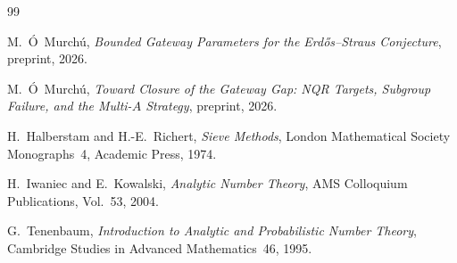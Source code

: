 \documentclass[12pt]{amsart}
\theoremstyle{definition}
\theoremstyle{remark}
\begin{document}
\begin{thebibliography}{99}

M.~\'O~Murch\'u,
\textit{Bounded Gateway Parameters for the
Erd\H{o}s--Straus Conjecture},
preprint, 2026.

M.~\'O~Murch\'u,
\textit{Toward Closure of the Gateway Gap:
NQR Targets, Subgroup Failure, and the Multi-$A$ Strategy},
preprint, 2026.

H.~Halberstam and H.-E.~Richert,
\textit{Sieve Methods},
London Mathematical Society Monographs~4, Academic Press, 1974.

H.~Iwaniec and E.~Kowalski,
\textit{Analytic Number Theory},
AMS Colloquium Publications, Vol.~53, 2004.

G.~Tenenbaum,
\textit{Introduction to Analytic and Probabilistic Number Theory},
Cambridge Studies in Advanced Mathematics~46, 1995.

\end{thebibliography}
\end{document}
